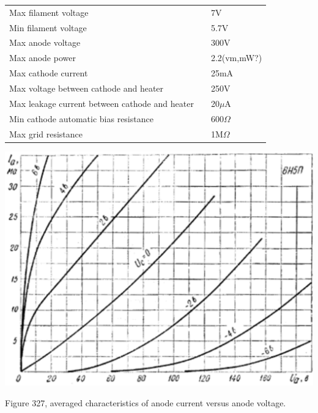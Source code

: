 \documentclass[12pt]{article}
\makeatletter
\renewcommand \dotfill {\leavevmode \cleaders \hb@xt@ 5mm{\hss .\hss }\hfill \kern \z@}
\makeatother
\begin{document}
    \begin{tabular}{p{105mm}l@{}l}
        Max filament voltage \hspace{0.0mm} \dotfill & \hspace{19mm} & 7V \\
        Min filament voltage \hspace{0.8mm} \dotfill & & 5.7V \\
        Max anode voltage \hspace{-1.1mm} \dotfill & & 300V \\
        Max anode power \hspace{1.2mm} \dotfill & & 2.2(vm,mW?) \\
        Max cathode current \hspace{0.4mm} \dotfill & & 25mA \\
        Max voltage between cathode and heater \hspace{-1.1mm} \dotfill & & 250V \\
        Max leakage current between cathode and heater \hspace{-5.5mm} \dotfill & & 20$\mu$A \\
        Min cathode automatic bias resistance \hspace{-1.3mm} \dotfill & & 600$\Omega$ \\
        Max grid resistance \hspace{-2.1mm} \dotfill & & 1M$\Omega$ \\
    \end{tabular}
    
    \vspace{5mm}
    \hspace{-5mm}
    \includegraphics[width=200mm]{graph.png}
    
    Figure 327, averaged characteristics of anode current versus anode voltage.
\end{document}

